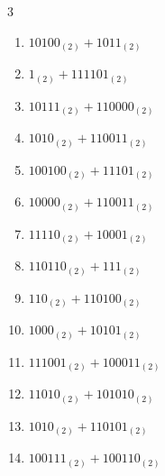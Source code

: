 \begin{multicols}{3}
\begin{enumerate}
  \item $10100_{(2)} + 1011_{(2)}$


  \item $1_{(2)} + 111101_{(2)}$


  \item $10111_{(2)} + 110000_{(2)}$


  \item $1010_{(2)} + 110011_{(2)}$


  \item $100100_{(2)} + 11101_{(2)}$


  \item $10000_{(2)} + 110011_{(2)}$


\columnbreak %

  \item $11110_{(2)} + 10001_{(2)}$


  \item $110110_{(2)} + 111_{(2)}$


  \item $110_{(2)} + 110100_{(2)}$


  \item $1000_{(2)} + 10101_{(2)}$


  \item $111001_{(2)} + 100011_{(2)}$


  \item $11010_{(2)} + 101010_{(2)}$


  \item $1010_{(2)} + 110101_{(2)}$


  \item $100111_{(2)} + 100110_{(2)}$


\end{enumerate}
\end{multicols}
